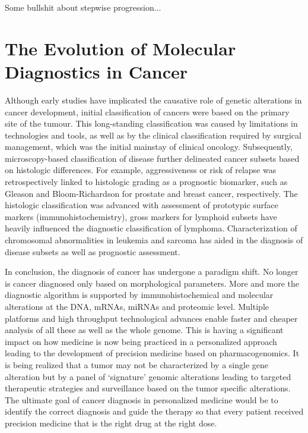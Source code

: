 Some bullshit about stepwise progression...

\section{The Evolution of Molecular Diagnostics in Cancer}
\label{sec:The Evolution of Molecular Diagnostics in Cancer}

Although early studies have implicated the causative role of genetic alterations in cancer development, initial classification of cancers were based on the primary site of the tumour. This long-standing classification was caused by limitations in technologies and tools, as well as by the clinical classification required by surgical management, which was the initial mainstay of clinical oncology. Subsequently, microscopy-based classification of disease further delineated cancer subsets based on histologic differences. For example, aggressiveness or risk of relapse was retrospectively linked to histologic grading as a prognostic biomarker, such as Gleason and Bloom-Richardson for prostate and breast cancer, respectively. The histologic classification was advanced with assessment of prototypic surface markers (immunohistochemistry), gross markers for lymphoid subsets have heavily influenced the diagnostic classification of lymphoma. Characterization of chromosomal abnormalities in leukemia and sarcoma has aided in the diagnosis of disease subsets as well as prognostic assessment.

In conclusion, the diagnosis of cancer has undergone a paradigm shift. No longer is cancer diagnosed only based on morphological parameters. More and more the diagnostic algorithm is supported by immunohistochemical and molecular alterations at the DNA, mRNAs, miRNAs and proteomic level. Multiple platforms and high throughput technological advances enable faster and cheaper analysis of all these as well as the whole genome. This is having a significant impact on how medicine is now being practiced in a personalized approach leading to the development of precision medicine based on pharmacogenomics. It is being realized that a tumor may not be characterized by a single gene alteration but by a panel of ‘signature’ genomic alterations leading to targeted therapeutic strategies and surveillance based on the tumor specific alterations. The ultimate goal of cancer diagnosis in personalized medicine would be to identify the correct diagnosis and guide the therapy so that every patient received precision medicine that is the right drug at the right dose.

